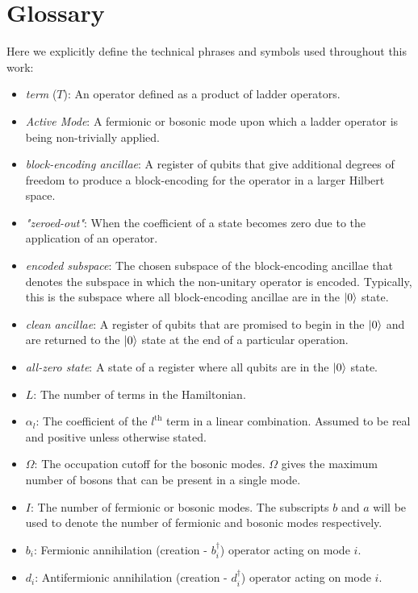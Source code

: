 \section{Glossary}
\label{sec:glossary}

Here we explicitly define the technical phrases and symbols used throughout this work:

\begin{itemize}
    \item \textit{term} ($T$): An operator defined as a product of ladder operators.
    \item \textit{Active Mode}: A fermionic or bosonic mode upon which a ladder operator is being non-trivially applied. 
    \item \textit{block-encoding ancillae}: A register of qubits that give additional degrees of freedom to produce a block-encoding for the operator in a larger Hilbert space.
    \item \textit{"zeroed-out"}: When the coefficient of a state becomes zero due to the application of an operator.
    \item \textit{encoded subspace}: The chosen subspace of the block-encoding ancillae that denotes the subspace in which the non-unitary operator is encoded. Typically, this is the subspace where all block-encoding ancillae are in the $\ket{0}$ state.
    \item \textit{clean ancillae}: A register of qubits that are promised to begin in the $\ket{0}$ and are returned to the $\ket{0}$ state at the end of a particular operation. 
    \item \textit{all-zero state}: A state of a register where all qubits are in the $\ket{0}$ state.
    \item $L$: The number of terms in the Hamiltonian.
    \item $\alpha_l$: The coefficient of the $l^\text{th}$ term in a linear combination. Assumed to be real and positive unless otherwise stated.
    \item $\Omega$: The occupation cutoff for the bosonic modes. $\Omega$ gives the maximum number of bosons that can be present in a single mode. 
    \item $I$: The number of fermionic or bosonic modes. The subscripts $b$ and $a$ will be used to denote the number of fermionic and bosonic modes respectively.
    \item $b_i$: Fermionic annihilation (creation - $b_i^\dagger$) operator acting on mode $i$.
    \item $d_i$: Antifermionic annihilation (creation - $d_i^\dagger$) operator acting on mode $i$.

\end{itemize}
